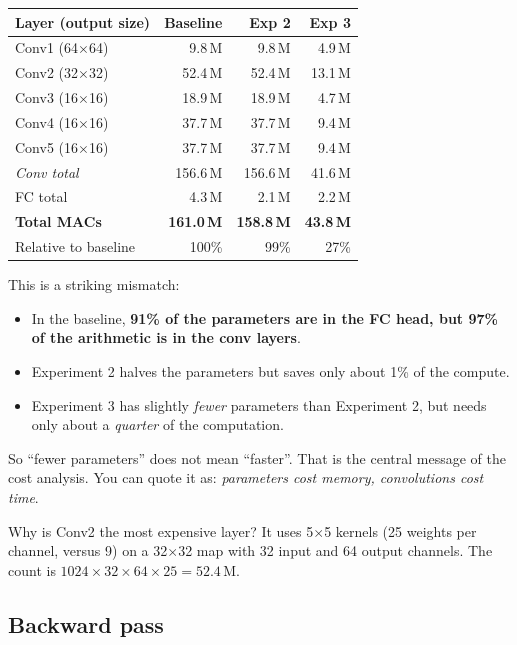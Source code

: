 \documentclass[11pt]{article}
\begin{document}
\begin{center}
\begin{tabular}{lrrr}
\toprule
Layer (output size) & Baseline & Exp 2 & Exp 3 \\
\midrule
Conv1 (64$\times$64) & 9.8\,M & 9.8\,M & 4.9\,M \\
Conv2 (32$\times$32) & 52.4\,M & 52.4\,M & 13.1\,M \\
Conv3 (16$\times$16) & 18.9\,M & 18.9\,M & 4.7\,M \\
Conv4 (16$\times$16) & 37.7\,M & 37.7\,M & 9.4\,M \\
Conv5 (16$\times$16) & 37.7\,M & 37.7\,M & 9.4\,M \\
\midrule
\emph{Conv total} & 156.6\,M & 156.6\,M & 41.6\,M \\
FC total & 4.3\,M & 2.1\,M & 2.2\,M \\
\midrule
\textbf{Total MACs} & \textbf{161.0\,M} & \textbf{158.8\,M} & \textbf{43.8\,M} \\
Relative to baseline & 100\% & 99\% & 27\% \\
\bottomrule
\end{tabular}
\end{center}

This is a striking mismatch:

\begin{itemize}[noitemsep]
\item In the baseline, \textbf{91\% of the parameters are in the FC head, but 97\% of the arithmetic is in the conv layers}.
\item Experiment 2 halves the parameters but saves only about 1\% of the compute.
\item Experiment 3 has slightly \emph{fewer} parameters than Experiment 2, but needs only about a \emph{quarter} of the computation.
\end{itemize}

So ``fewer parameters'' does not mean ``faster''. That is the central message of the cost analysis. You can quote it as: \emph{parameters cost memory, convolutions cost time}.

Why is Conv2 the most expensive layer? It uses 5$\times$5 kernels (25 weights per channel, versus 9) on a 32$\times$32 map with 32 input and 64 output channels. The count is $1024\times 32\times 64\times 25 = 52.4$\,M.

\subsection{Backward pass}
\end{document}
